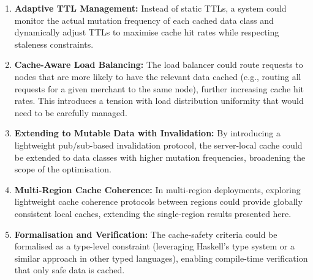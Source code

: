 \documentclass[12pt,a4paper]{report}
\begin{document}
\begin{enumerate}
    \item \textbf{Adaptive TTL Management:} Instead of static TTLs, a system could monitor the actual mutation frequency of each cached data class and dynamically adjust TTLs to maximise cache hit rates while respecting staleness constraints.

    \item \textbf{Cache-Aware Load Balancing:} The load balancer could route requests to nodes that are more likely to have the relevant data cached (e.g., routing all requests for a given merchant to the same node), further increasing cache hit rates. This introduces a tension with load distribution uniformity that would need to be carefully managed.

    \item \textbf{Extending to Mutable Data with Invalidation:} By introducing a lightweight pub/sub-based invalidation protocol, the server-local cache could be extended to data classes with higher mutation frequencies, broadening the scope of the optimisation.

    \item \textbf{Multi-Region Cache Coherence:} In multi-region deployments, exploring lightweight cache coherence protocols between regions could provide globally consistent local caches, extending the single-region results presented here.

    \item \textbf{Formalisation and Verification:} The cache-safety criteria could be formalised as a type-level constraint (leveraging Haskell's type system or a similar approach in other typed languages), enabling compile-time verification that only safe data is cached.
\end{enumerate}
\end{document}

